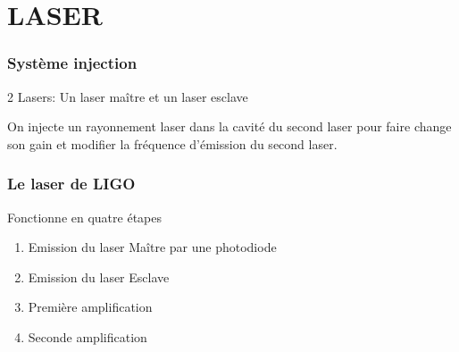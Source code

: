 \documentclass{beamer}
\begin{document}
\section{LASER}


\begin{frame}
	\frametitle{Système injection}
	2 Lasers: Un laser maître et un laser esclave
	\break

	On injecte un rayonnement laser dans la cavité du second laser pour faire change son gain et modifier la fréquence d'émission du second laser.
\end{frame}

\begin{frame}
	\frametitle{Le laser de LIGO}
	Fonctionne en quatre étapes
	\begin{enumerate}[1.]
		\item Emission du laser Maître par une photodiode
		\item Emission du laser Esclave
		\item Première amplification
		\item Seconde amplification 
	\end{enumerate}
\end{frame}
\end{document}
